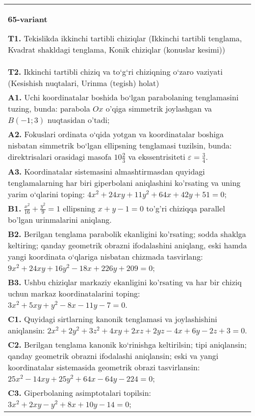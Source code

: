 \documentclass{article}
\begin{document}
\begin{tabular}{m{17cm}}
\textbf{65-variant}
\newline

\textbf{T1.} Tekislikda ikkinchi tartibli chiziqlar (Ikkinchi tartibli tenglama, Kvadrat shakldagi tenglama, Konik chiziqlar (konuslar kesimi)) \\
\textbf{T2.} Ikkinchi tartibli chiziq va to‘g‘ri chiziqning o‘zaro vaziyati (Kesishish nuqtalari, Urinma (tegish) holat) \\
\textbf{A1.} Uchi koordinatalar boshida bo‘lgan parabolaning tenglamasini tuzing, bunda: parabola $Ox$ o'qiga simmetrik joylashgan va $B(-1 ; 3)$ nuqtasidan o'tadi; \\
\textbf{A2.} Fokuslari ordinata o‘qida yotgan va koordinatalar boshiga nisbatan simmetrik bo‘lgan ellipsning tenglamasi tuzilsin, bunda: direktrisalari orasidagi masofa $10 \frac{2}{3}$ va ekssentrisiteti $\varepsilon=\frac{3}{4}$. \\
\textbf{A3.} Koordinatalar sistemasini almashtirmasdan quyidagi tenglamalarning har biri giperbolani aniqlashini ko'rsating va uning yarim o‘qlarini toping: $4 x^2+24 x y+11 y^2+64 x+42 y+51=0$; \\
\textbf{B1.} $\frac{x^2}{16}+\frac{y^2}{9}=1$ ellipsning $x+y-1=0$ to'g'ri chiziqqa parallel bo'lgan urinmalarini aniqlang. \\
\textbf{B2.} Berilgan tenglama parabolik ekanligini ko'rsating; sodda shaklga keltiring; qanday geometrik obrazni ifodalashini aniqlang, eski hamda yangi koordinata o‘qlariga nisbatan chizmada tasvirlang: $9 x^2+24 x y+16 y^2-18 x+226 y+209=0$; \\
\textbf{B3.} Ushbu chiziqlar markaziy ekanligini ko'rsating va har bir chiziq uchun markaz koordinatalarini toping: $3x^2+5xy+y^2-8x-11y-7=0$. \\
\textbf{C1.} Quyidagi sirtlarning kanonik tenglamasi va joylashishini aniqlansin: $2 x^2+2 y^2+3 z^2+4 x y+2 x z+2 y z-4 x+6 y-2 z+3=0$. \\
\textbf{C2.} Berilgan tenglama kanonik ko‘rinishga keltirilsin; tipi aniqlansin; qanday geometrik obrazni ifodalashi aniqlansin; eski va yangi koordinatalar sistemasida geometrik obrazi tasvirlansin: $25 x^2-14 x y+25 y^2+64 x-64 y-224=0$; \\
\textbf{C3.} Giperbolaning asimptotalari topilsin: $3 x^2+2 x y-y^2+8 x+10 y-14=0$; \\

\end{tabular}
\vspace{1cm}
\end{document}

